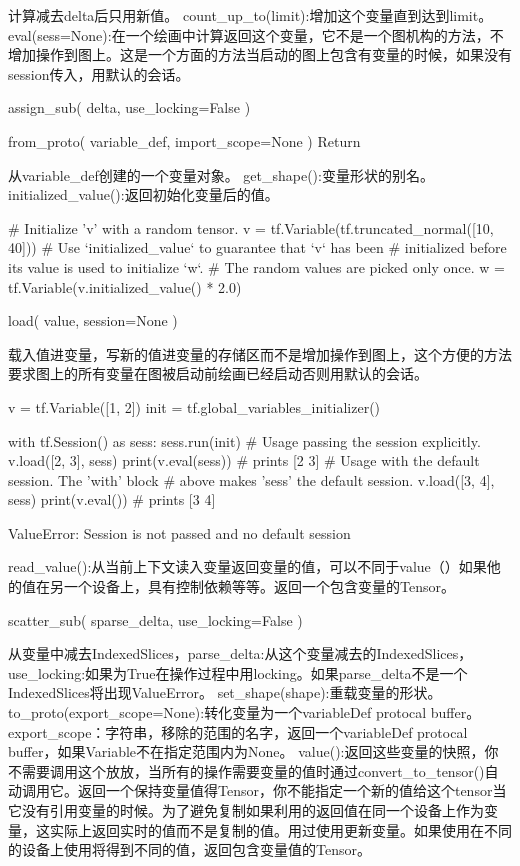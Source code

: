 计算减去delta后只用新值。
count\_up\_to(limit):增加这个变量直到达到limit。\newline
eval(sess=None):在一个绘画中计算返回这个变量，它不是一个图机构的方法，不增加操作到图上。这是一个方面的方法当启动的图上包含有变量的时候，如果没有session传入，用默认的会话。
\begin{python}
assign_sub(
    delta,
    use_locking=False
)
\end{python}
\begin{python}
from_proto(
    variable_def,
    import_scope=None
)
Return
\end{python}
从variable\_def创建的一个变量对象。\newline
get\_shape():变量形状的别名。\newline
initialized\_value():返回初始化变量后的值。
\begin{python}
# Initialize 'v' with a random tensor.
v = tf.Variable(tf.truncated_normal([10, 40]))
# Use `initialized_value` to guarantee that `v` has been
# initialized before its value is used to initialize `w`.
# The random values are picked only once.
w = tf.Variable(v.initialized_value() * 2.0)
\end{python}
\begin{python}
load(
    value,
    session=None
)
\end{python}
载入值进变量，写新的值进变量的存储区而不是增加操作到图上，这个方便的方法要求图上的所有变量在图被启动前绘画已经启动否则用默认的会话。
\begin{python}
v = tf.Variable([1, 2])
init = tf.global_variables_initializer()

with tf.Session() as sess:
    sess.run(init)
    # Usage passing the session explicitly.
    v.load([2, 3], sess)
    print(v.eval(sess)) # prints [2 3]
    # Usage with the default session.  The 'with' block
    # above makes 'sess' the default session.
    v.load([3, 4], sess)
    print(v.eval()) # prints [3 4]
\end{python}
ValueError: Session is not passed and no default session

read\_value():从当前上下文读入变量返回变量的值，可以不同于value（）如果他的值在另一个设备上，具有控制依赖等等。返回一个包含变量的Tensor。
\begin{python}
scatter_sub(
    sparse_delta,
    use_locking=False
)
\end{python}
从变量中减去IndexedSlices，parse_delta:从这个变量减去的IndexedSlices，use\_locking:如果为True在操作过程中用locking。如果parse_delta不是一个IndexedSlices将出现ValueError。
set\_shape(shape):重载变量的形状。\newline
to\_proto(export\_scope=None):转化变量为一个variableDef protocal buffer。export\_scope：字符串，移除的范围的名字，返回一个variableDef protocal buffer，如果Variable不在指定范围内为None。\newline
value():返回这些变量的快照，你不需要调用这个放放，当所有的操作需要变量的值时通过convert\_to\_tensor()自动调用它。返回一个保持变量值得Tensor，你不能指定一个新的值给这个tensor当它没有引用变量的时候。为了避免复制如果利用的返回值在同一个设备上作为变量，这实际上返回实时的值而不是复制的值。用过使用更新变量。如果使用在不同的设备上使用将得到不同的值，返回包含变量值的Tensor。
